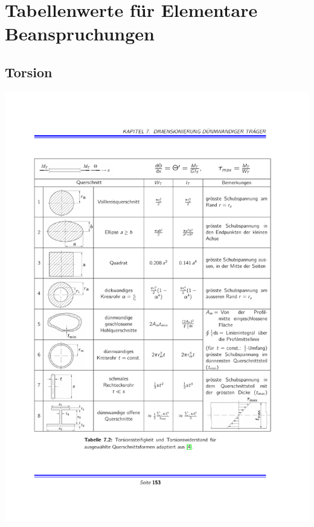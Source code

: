 
\chapter{Tabellenwerte für Elementare Beanspruchungen} %
	\section{Torsion} %
		\label{torsion}
		\includegraphics[width=\columnwidth]{graphics/darmstadt}

